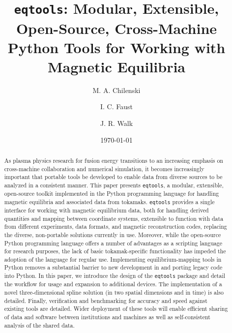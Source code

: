 \documentclass{elsarticle}
\newcommand{\eqtools}{\texttt{eqtools}\xspace}
\begin{document}
\title{\eqtools: Modular, Extensible, Open-Source, Cross-Machine Python Tools for Working with Magnetic Equilibria}

\author[PSFC]{M. A. Chilenski}

\author[PSFC]{I. C. Faust}

\author[PSFC]{J. R. Walk}


\address[PSFC]{Plasma Science and Fusion Center, Massachusetts Institute of Technology, Cambridge, MA, 02139, USA}

\date{\today}

\begin{abstract}
As plasma physics research for fusion energy transitions to an increasing emphasis on cross-machine collaboration and numerical simulation, it becomes increasingly important that portable tools be developed to enable data from diverse sources to be analyzed in a consistent manner. 
This paper presents \eqtools, a modular, extensible, open-source toolkit implemented in the Python programming language for handling magnetic equilibria and associated data from tokamaks. 
\eqtools provides a single interface for working with magnetic equilibrium data, both for handling derived quantities and mapping between coordinate systems, extensible to function with data from different experiments, data formats, and magnetic reconstruction codes, replacing the diverse, non-portable solutions currently in use.  
Moreover, while the open-source Python programming language offers a number of advantages as a scripting language for research purposes, the lack of basic tokamak-specific functionality has impeded the adoption of the language for regular use.
Implementing equilibrium-mapping tools in Python removes a substantial barrier to new development in and porting legacy code into Python.
In this paper, we introduce the design of the \eqtools package and detail the workflow for usage and expansion to additional devices.  The implementation of a novel three-dimensional spline solution (in two spatial dimensions and in time) is also detailed.  
Finally, verification and benchmarking for accuracy and speed against existing tools are detailed. Wider deployment of these tools will enable efficient sharing of data and software between institutions and machines as well as self-consistent analysis of the shared data.
\end{abstract}
\end{document}

